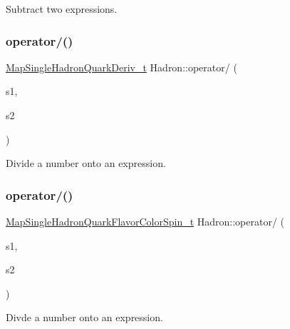 Subtract two expressions. 

\mbox{\label{namespaceHadron_aee22779796ebd9e7ee8772c1eb965b6c}} 
\subsubsection{\texorpdfstring{operator/()}{operator/()}\hspace{0.1cm}{\footnotesize\ttfamily [1/2]}}
{\footnotesize\ttfamily \mbox{\hyperlink{namespaceHadron_aa588220689caea8a6aad4d0296526e6b}{Map\+Single\+Hadron\+Quark\+Deriv\+\_\+t}} Hadron\+::operator/ (\begin{DoxyParamCaption}\item[{const \mbox{\hyperlink{namespaceHadron_aa588220689caea8a6aad4d0296526e6b}{Map\+Single\+Hadron\+Quark\+Deriv\+\_\+t}} \&}]{s1,  }\item[{double}]{s2 }\end{DoxyParamCaption})}



Divide a number onto an expression. 

\mbox{\label{namespaceHadron_ae43d51b030dac0dd81991cf7c401507a}} 
\subsubsection{\texorpdfstring{operator/()}{operator/()}\hspace{0.1cm}{\footnotesize\ttfamily [2/2]}}
{\footnotesize\ttfamily \mbox{\hyperlink{namespaceHadron_a03b319764f85c20434f20a269ce5f388}{Map\+Single\+Hadron\+Quark\+Flavor\+Color\+Spin\+\_\+t}} Hadron\+::operator/ (\begin{DoxyParamCaption}\item[{const \mbox{\hyperlink{namespaceHadron_a03b319764f85c20434f20a269ce5f388}{Map\+Single\+Hadron\+Quark\+Flavor\+Color\+Spin\+\_\+t}} \&}]{s1,  }\item[{double}]{s2 }\end{DoxyParamCaption})}



Divde a number onto an expression. 

\mbox{\label{namespaceHadron_a43c37405dc872b3d2d1f477ca914424a}} 
